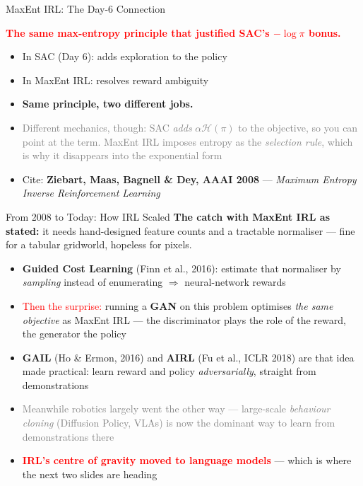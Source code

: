 \begin{frame}{MaxEnt IRL: The Day-6 Connection}
\vspace{0.4em}
\begin{center}
\textcolor{red}{\textbf{The same max-entropy principle that justified SAC's $-\log\pi$ bonus.}}
\end{center}
\vspace{0.8em}
\begin{itemize}
    \setlength{\itemsep}{0.7em}
    \item In SAC (Day 6): adds exploration to the policy
    \item In MaxEnt IRL: resolves reward ambiguity
    \item \textbf{Same principle, two different jobs.}
    \item \textcolor{gray}{Different mechanics, though: SAC \emph{adds} $\alpha\mathcal{H}(\pi)$ to the objective, so you can point at the term. MaxEnt IRL imposes entropy as the \emph{selection rule}, which is why it disappears into the exponential form}
    \item Cite: \textbf{Ziebart, Maas, Bagnell \& Dey, AAAI 2008} --- \emph{Maximum Entropy Inverse Reinforcement Learning}
\end{itemize}
\end{frame}

\begin{frame}{From 2008 to Today: How IRL Scaled}
\textbf{The catch with MaxEnt IRL as stated:} it needs hand-designed feature counts and a tractable normaliser --- fine for a tabular gridworld, hopeless for pixels.
\vspace{0.3em}
\begin{itemize}
    \setlength{\itemsep}{0.4em}
    \item \textbf{Guided Cost Learning} (Finn et al., 2016): estimate that normaliser by \emph{sampling} instead of enumerating $\Rightarrow$ neural-network rewards
    \item \textcolor{red}{Then the surprise:} running a \textbf{GAN} on this problem optimises \emph{the same objective} as MaxEnt IRL --- the discriminator plays the role of the reward, the generator the policy
    \item \textbf{GAIL} (Ho \& Ermon, 2016) and \textbf{AIRL} (Fu et al., ICLR 2018) are that idea made practical: learn reward and policy \emph{adversarially}, straight from demonstrations
    \item \textcolor{gray}{Meanwhile robotics largely went the other way --- large-scale \emph{behaviour cloning} (Diffusion Policy, VLAs) is now the dominant way to learn from demonstrations there}
    \item \textcolor{red}{\textbf{IRL's centre of gravity moved to language models}} --- which is where the next two slides are heading
\end{itemize}
\end{frame}


